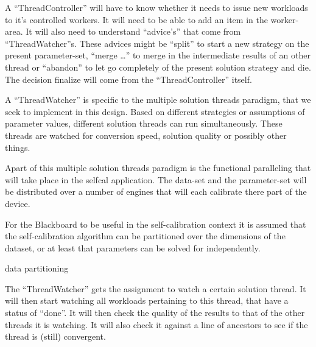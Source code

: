 \documentclass[]{lofar}
\begin{document}
          A ``ThreadController''  will have to know whether it needs to issue new
          workloads to it's controlled workers. It will need to be
          able to add an item in the worker-area. It will also need to
          understand ``advice's'' that come from
          ``ThreadWatcher''s. These advices might be ``split'' to
          start a new strategy on the present parameter-set, ``merge
          \ldots'' to merge in the intermediate results of an other
          thread or ``abandon'' to let go completely of the present
          solution strategy and die. The decision finalize will come
          from the ``ThreadController'' itself.

          A ``ThreadWatcher''  is
          specific to the multiple solution threads paradigm, that we
          seek to implement in this design. Based on different
          strategies or assumptions of parameter values, different
          solution threads can run
          simultaneously. These threads are watched for conversion
          speed, solution quality or possibly other things.

          Apart of this multiple solution threads paradigm is the
          functional paralleling that will take place in the selfcal
          application. The data-set and the parameter-set will be
          distributed over a number of engines that will each
          calibrate there part of the device.

          \begin{assumption}
            For the Blackboard to be useful in the self-calibration
            context it is assumed that the self-calibration algorithm
            can be partitioned over the dimensions of the dataset, or
            at least that parameters can be solved for
            independently.\footnotemark[\value{footnote}]
            \caption{data partitioning\label{ass:partitionable}}
          \end{assumption}


          The ``ThreadWatcher''  gets
          the assignment to watch a certain solution
          thread. It will then start
          watching all workloads pertaining to this thread, that have
          a status of ``done''. It will then check the quality of the
          results to that of the other threads it is watching. It will
          also check it against a line of ancestors to see if the
          thread is (still) convergent.
\end{document}
